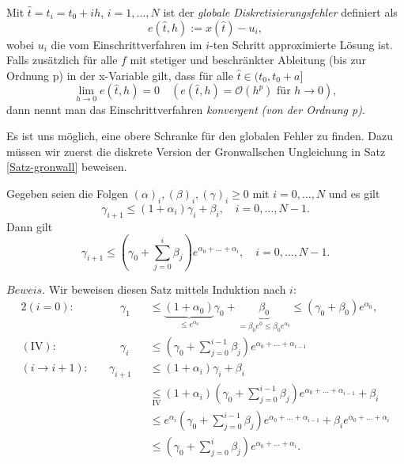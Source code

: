 \begin{definition}
    Mit $\hat{t} = t_i = t_0+ih$, $i=1,\dots, N$ ist der {\em globale Diskretisierungsfehler} definiert als
    \[
        e(\hat{t}, h) := x(\hat{t}) - u_i,
    \]
    wobei $u_i$ die vom Einschrittverfahren im $i$-ten Schritt approximierte Lösung ist.\\
    Falls zusätzlich für alle $f$ mit stetiger und beschränkter Ableitung (bis zur Ordnung p) in der x-Variable gilt,
    dass für alle $\hat{t} \in (t_0, t_0+a]$
    \[
        \lim_{h \rightarrow 0 } e(\hat{t}, h)=0 \quad (e(\hat{t},h) = \mathcal{O}(h^p) \text{ für } h \rightarrow 0),
    \] dann nennt man das Einschrittverfahren {\em konvergent} {\em (von der Ordnung p)}.
\end{definition}
Es ist uns möglich, eine obere Schranke für den globalen Fehler zu finden. Dazu müssen wir zuerst die diskrete Version
der Gronwallschen Ungleichung in Satz \ref{Satz-gronwall} beweisen.
\begin{satz}
    Gegeben seien die Folgen \newline $(\alpha)_i,(\beta)_i,(\gamma)_i \geq 0$ mit $i = 0,\dots,N$ und es gilt
    \[
        \gamma_{i+1} \leq (1 + \alpha_i)\gamma_i + \beta_i, \quad i=0,\dots,N-1.
    \] Dann gilt
    \[
        \gamma_{i+1} \leq \left( \gamma_0 + \sum_{j=0}^{i}\beta_j \right) e^{\alpha_0 + \dots + \alpha_i},  \quad
        i=0, \dots, N-1.
    \]
\end{satz}
$Beweis.$ Wir beweisen diesen Satz mittels Induktion nach $i$:
\begin{alignat*}{2}
    (i=0):& \qquad \gamma_1 &&\leq
    \underbrace{(1 + \alpha_0)}_{\leq e^{\alpha_0}}\gamma_0 +
    \underbrace{\beta_0}_{=\beta_0 e^{0} \leq \beta_0 e^{\alpha_0}} \leq (\gamma_0 + \beta_0)e^{\alpha_0},\\
    (\text{IV}):& \qquad
    \gamma_{i} &&\leq \left( \gamma_0 + \sum_{j=0}^{i-1}\beta_j \right) e^{\alpha_0 + \dots + \alpha_{i-1}} \\
    (i \rightarrow i+1):& \quad
    \gamma_{i+1} &&\leq (1 + \alpha_{i})\gamma_{i} + \beta_i\\
    & &&\underset{\text{IV}}{\leq} (1 + \alpha_i)
    \left( \gamma_0 + \sum_{j=0}^{i-1}\beta_j \right) e^{\alpha_0 + \dots + \alpha_{i-1}}+\beta_{i}\\
    &  &&\leq e^{\alpha_i} \left( \gamma_0 + \sum_{j=0}^{i-1}\beta_j \right) e^{\alpha_0 + \dots + \alpha_{i-1}}
    + \beta_i e^{\alpha_0 + \dots + \alpha_{i}}\\
    &  &&\leq \left( \gamma_0 +  \sum_{j=0}^{i}\beta_j \right) e^{\alpha_0 + \dots + \alpha_{i}}.
\end{alignat*}\qedwhite
